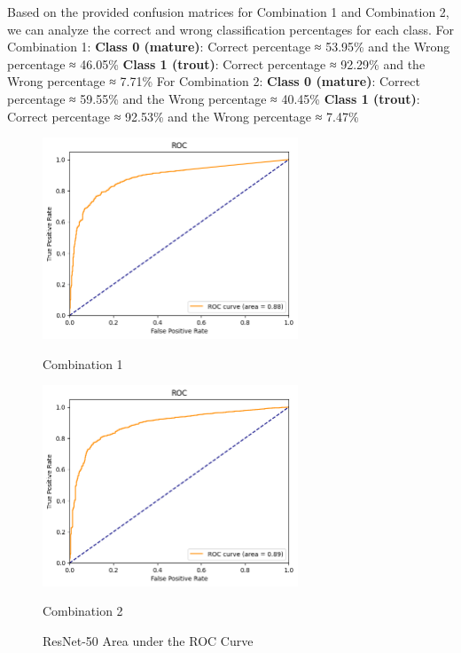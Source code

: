 Based on the provided confusion matrices for Combination 1 and Combination 2, we can analyze the correct and wrong classification percentages for each class. \newline
For Combination 1: \textbf{Class 0 (mature)}: Correct percentage ≈ 53.95\% and the Wrong percentage ≈ 46.05\%
\textbf{Class 1 (trout)}: Correct percentage ≈ 92.29\% and the Wrong percentage ≈ 7.71\%
\newline
For Combination 2: \textbf{Class 0 (mature)}: Correct percentage ≈ 59.55\% and the Wrong percentage ≈ 40.45\%
\textbf{Class 1 (trout)}: Correct percentage ≈ 92.53\% and the Wrong percentage ≈ 7.47\%


\begin{figure}[H]
    \centering
    \begin{minipage}[b]{0.49\textwidth}
        \centering
        \includegraphics[width=\textwidth, height=6cm]{Figures/unbalanced_data/without bn/resnet/roc.png}
        \captionsetup{labelformat=empty}
        \caption{Combination 1}
        \label{fig:u_wo_r_roc}
    \end{minipage}
    \hfill
    \begin{minipage}[b]{0.49\textwidth}
        \centering
        \includegraphics[width=\textwidth, height=6cm]{Figures/unbalanced_data/with bn/resnet/roc.png}
        \captionsetup{labelformat=empty}
        \caption{Combination 2}
        \label{fig:u_w_r_roc}
    \end{minipage}
    \captionsetup{labelformat=default}
    \caption{ResNet-50 Area under the ROC Curve}
\end{figure}

